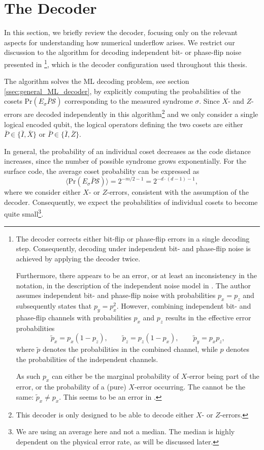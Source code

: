 \section{The Decoder}\label{sec:num_underflow_decoder}

In this section, we briefly review the decoder, focusing only on the relevant aspects for understanding how numerical underflow arises.
We restrict our discussion to the algorithm for decoding independent bit- or phase-flip noise presented in \cite{efficient_decoding_algorithm}\footnote{
The decoder corrects either bit-flip or phase-flip errors in a single decoding step. 
Consequently, decoding under independent bit- and phase-flip noise is achieved by applying the decoder twice.

Furthermore, there appears to be an error, or at least an inconsistency in the notation, 
in the description of the independent noise model in \cite{efficient_decoding_algorithm}. 
The author assumes independent bit- and phase-flip noise with probabilities $p_x=p_z$ and subsequently states that $p_y=p_x^2$. 
However, combining independent bit- and phase-flip channels with probabilities $p_x$ and $p_z$ results in the effective error probabilities
\[
    \tilde{p}_x = p_x(1-p_z), \qquad
    \tilde{p}_z = p_z(1-p_x), \qquad
    \tilde{p}_y = p_x p_z,
\]
where $\tilde{p}$ denotes the probabilities in the combined channel, while $p$ denotes the probabilities of the independent channels.

As such $p_x$ can either be the marginal probability of $X$-error being part of the error, or the probability of a (pure) $X$-error occurring.
The cannot be the same: $\tilde{p}_x \neq p_x $. 
This seems to be an error in \cite{efficient_decoding_algorithm}. 
}, which is the decoder configuration used throughout this thesis.

The algorithm solves the ML decoding problem, see section \ref{ssec:general_ML_decoder}, by explicitly computing the probabilities of the cosets $\text{Pr}(E_\sigma \bar{P}\mathcal{S})$ corresponding to the measured syndrome $\sigma$.
Since  $X$- and $Z$-errors are decoded independently in this algorithm\footnote{
    This decoder is only designed to be able to decode either $X$- or $Z$-errors.
} and we only consider a single logical encoded qubit, 
the logical operators defining the two cosets are either $\bar{P} \in \{\bar{I},\bar{X}\}$ or $\bar{P} \in \{\bar{I},\bar{Z}\}$.

In general, the probability of an individual coset decreases as the code distance increases, since the number of possible syndrome grows exponentially.
For the surface code, the average coset probability can be expressed as 
\begin{equation}
    \langle \text{Pr}(E_\sigma \bar{P} \mathcal{S}) \rangle = 2^{-m/2-1}= 2^{-d\cdot(d-1)-1},
    \label{eq:mean_prop_coset_in_distance}
\end{equation} 
where we consider either $X$- or $Z$-errors, consistent with the assumption of the decoder.
Consequently, we expect the probabilities of individual cosets to become quite small\footnote{
    We are using an average here and not a median. 
    The median is highly dependent on the physical error rate, as will be discussed later. 
}.

